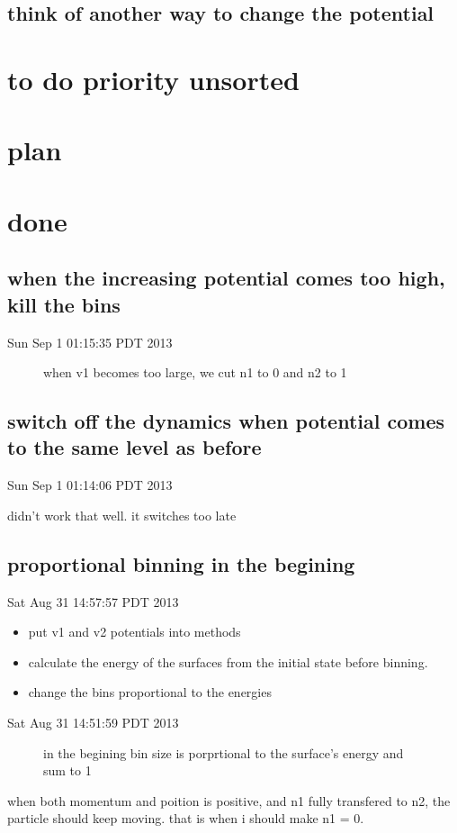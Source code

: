 \documentclass{article}
\let\Item\item
\renewcommand\item{\normalcolor\Item}
\newcommand\done{\color[RGB]{129, 180, 185} \ding{52} }
\begin{document}
\subsection{think of another way to change the potential}
\section{to do priority unsorted}
\section{plan}
\section{done}
\subsection{when the increasing potential comes too high, kill the bins}
Sun Sep  1 01:15:35 PDT 2013
\begin{figure}[h]
  \centering
  
  \caption{when v1 becomes too large, we cut n1 to 0 and n2 to 1}
  \label{fig:endpotbin}
\end{figure}
\subsection{switch off the dynamics when potential comes to the same level as before}
Sun Sep  1 01:14:06 PDT 2013

didn't work that well. it switches too late
\subsection{proportional binning in the begining}
Sat Aug 31 14:57:57 PDT 2013
\begin{itemize}
  \item \done put v1 and v2 potentials into methods
  \item \done calculate the energy of the surfaces from the initial state before binning.
  \item \done change the bins proportional to the energies
\end{itemize}
Sat Aug 31 14:51:59 PDT 2013
\begin{figure}[H]
  \centering
  
  \caption{in the begining bin size is porprtional to the surface's energy and sum to 1}
  \label{fig:proportional_binning}
\end{figure}
when both momentum and poition is positive, and n1 fully transfered to n2, the particle should keep moving. 
that is when i should make n1 = 0.
\end{document}
